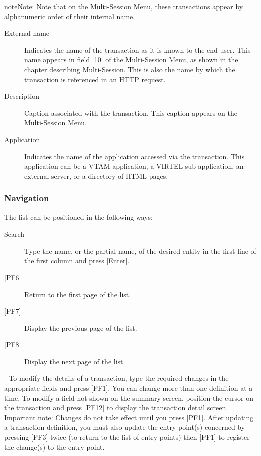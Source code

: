 \documentclass[letterpaper,10pt,english]{sphinxmanual}
\begin{document}
\begin{sphinxadmonition}{note}{Note:}
Note that on the Multi-Session Menu, these transactions appear by alphanumeric order of their internal name.
\end{sphinxadmonition}
\begin{description}
\item[{External name}] \leavevmode
Indicates the name of the transaction as it is known to the end user. This name appears in field {[}10{]} of the Multi-Session Menu, as shown in the chapter describing Multi-Session. This is also the name by which the transaction is referenced in an HTTP request.

\item[{Description}] \leavevmode
Caption associated with the transaction. This caption appears on the Multi-Session Menu.

\item[{Application}] \leavevmode
Indicates the name of the application accessed via the transaction. This application can be a VTAM application, a VIRTEL sub-application, an external server, or a directory of HTML pages.

\end{description}


\subsubsection{Navigation}
\label{\detokenize{connectivity_guide:id63}}
The list can be positioned in the following ways:
\begin{description}
\item[{Search}] \leavevmode
Type the name, or the partial name, of the desired entity in the first line of the first column and press {[}Enter{]}.

\item[{{[}PF6{]}}] \leavevmode
Return to the first page of the list.

\item[{{[}PF7{]}}] \leavevmode
Display the previous page of the list.

\item[{{[}PF8{]}}] \leavevmode
Display the next page of the list.

\end{description}

 - To modify the details of a transaction, type the required changes in the appropriate fields and press {[}PF1{]}. You can change more than one definition at a time. To modify a field not shown on the summary screen, position the cursor on the transaction and press {[}PF12{]} to display the transaction detail screen. Important note: Changes do not take effect until you press {[}PF1{]}. After updating a transaction definition, you must also update the entry point(s) concerned by pressing {[}PF3{]} twice (to return to the list of entry points) then {[}PF1{]} to register the change(s) to the entry point.
\end{document}

